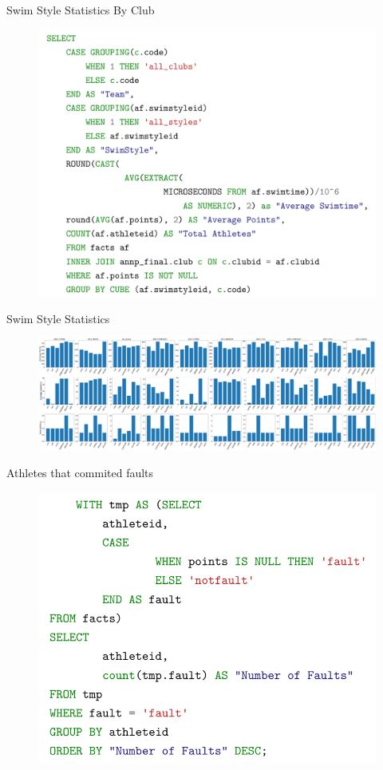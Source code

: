 \documentclass[aspectratio=169, xcolor=dvipsnames]{beamer}
\begin{document}
\begin{frame}{Swim Style Statistics By Club}

\begin{figure}
    \includegraphics[scale=0.25]{img/code2.png}
\end{figure}

\end{frame}

\begin{frame}{Swim Style Statistics}
\begin{figure}
    \centering
    \includegraphics[width=\textwidth]{img/stats_clubs_swim.pdf}
\end{figure}
\end{frame}

\begin{frame}{Athletes that commited faults}
    \begin{figure}
        \centering
        \includegraphics[width=.55\textwidth]{img/faultcode.png}
    \end{figure}
\end{frame}
\end{document}

